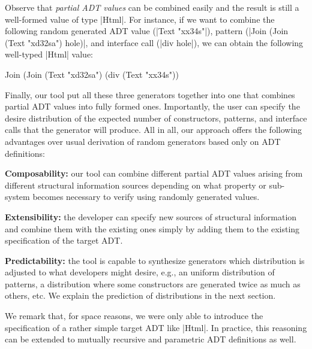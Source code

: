 Observe that \emph{partial ADT values} can be combined easily and the result is
still a well-formed value of type |Html|.
%
For instance, if we want to combine the following random generated ADT value
(|Text "xx34s"|), pattern (|Join (Join (Text "xd32sa") hole)|, and interface
call (|div hole|), we can obtain the following well-typed |Html| value:
%
\begin{code}
 Join (Join (Text "xd32sa") (div (Text "xx34s"))
\end{code}


Finally, our tool put all these three generators together into one that combines
partial ADT values into fully formed ones.
%
Importantly, the user can specify the desire distribution of the expected number
of constructors, patterns, and interface calls that the generator will produce.
%
All in all, our approach offers the following advantages over usual derivation
of random generators based only on ADT definitions:
%
\begin{CompactItemize}
\item \textbf{Composability:} our tool can combine different partial ADT values
  arising from different structural information sources depending on what
  property or sub-system becomes necessary to verify using randomly generated
  values.
\item \textbf{Extensibility:} the developer can specify new sources of
  structural information and combine them with the existing ones simply by
  adding them to the existing specification of the target ADT.
\item \textbf{Predictability:} the tool is capable to synthesize generators
  which distribution is adjusted to what developers might desire, e.g., an
  uniform distribution of patterns, a distribution where some constructors are
  generated twice as much as others, etc. We explain the prediction of
  distributions in the next section.
\end{CompactItemize}


We remark that, for space reasons, we were only able to introduce the
specification of a rather simple target ADT like |Html|.
%
In practice, this reasoning can be extended to mutually recursive and parametric
ADT definitions as well.

